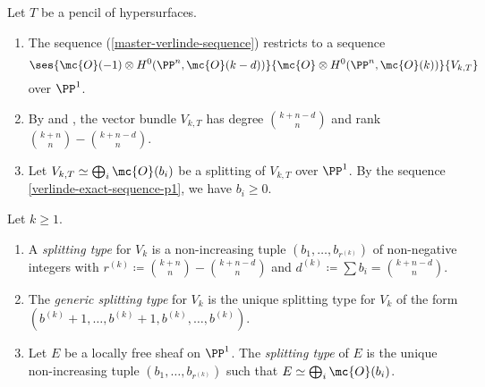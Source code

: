 


\begin{remark}
	Let $T$ be a pencil of hypersurfaces.

	\begin{enumerate}
	\item The sequence (\ref{master-verlinde-sequence}) restricts to a sequence
	\begin{equation} \label{verlinde-exact-sequence-p1}
	\ses{\mc{O}(-1) \otimes H^0(\PP^n, \mc{O}(k-d))}
	    {\mc{O} \otimes H^0(\PP^n, \mc{O}(k))}
	    {V_{k,T}}
	\end{equation}
	over $\PP^1$.

	\item By  and , the vector bundle $V_{k,T}$ has degree $\binom{k+n-d}{n}$ and rank $\binom{k+n}{n} - \binom{k+n-d}{n}$.

	\item Let $V_{k,T} \simeq \bigoplus_i \mc{O}(b_i)$ be a splitting of $V_{k,T}$ over $\PP^1$. By the sequence \cref{verlinde-exact-sequence-p1}, we have $b_i \geq 0$.
	\end{enumerate}
\end{remark}

\begin{definition}
Let $k\geq 1$.

\begin{enumerate}
\item A \emph{splitting type} for $V_k$ is a non-increasing tuple $(b_1,\dotsc,b_{r^{(k)}})$ of non-negative integers with
$r^{(k)}\coloneqq\binom{k+n}{n}-\binom{k+n-d}{n}$ and $d^{(k)}\coloneqq\sum b_i = \binom{k+n-d}{n}$.

\item The \emph{generic splitting type} for $V_k$ is the unique splitting type for $V_k$ of the form
$(b^{(k)} + 1,\dotsc,b^{(k)} + 1,b^{(k)},\dotsc,b^{(k)})$.

\item Let $E$ be a locally free sheaf on $\PP^1$. The \emph{splitting type} of $E$ is the unique non-increasing tuple $(b_1,\dotsc,b_{r^{(k)}})$ such that $E \simeq \bigoplus_i \mc{O}(b_i)$.
\end{enumerate}
\end{definition}

